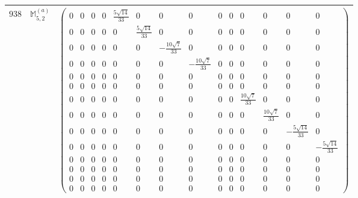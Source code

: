 \documentclass[fleqn,8pt,landscape]{jsarticle}
\begin{document}
\begin{center}
\begin{longtable}{ccc}
$ 938 $ & $ \mathbb{M}_{5,2}^{(a)} $ & $ \begin{pmatrix} 0 & 0 & 0 & 0 & \frac{5 \sqrt{14}}{33} & 0 & 0 & 0 & 0 & 0 & 0 & 0 & 0 & 0 \\ 0 & 0 & 0 & 0 & 0 & \frac{5 \sqrt{14}}{33} & 0 & 0 & 0 & 0 & 0 & 0 & 0 & 0 \\ 0 & 0 & 0 & 0 & 0 & 0 & - \frac{10 \sqrt{7}}{33} & 0 & 0 & 0 & 0 & 0 & 0 & 0 \\ 0 & 0 & 0 & 0 & 0 & 0 & 0 & - \frac{10 \sqrt{7}}{33} & 0 & 0 & 0 & 0 & 0 & 0 \\ 0 & 0 & 0 & 0 & 0 & 0 & 0 & 0 & 0 & 0 & 0 & 0 & 0 & 0 \\ 0 & 0 & 0 & 0 & 0 & 0 & 0 & 0 & 0 & 0 & 0 & 0 & 0 & 0 \\ 0 & 0 & 0 & 0 & 0 & 0 & 0 & 0 & 0 & 0 & \frac{10 \sqrt{7}}{33} & 0 & 0 & 0 \\ 0 & 0 & 0 & 0 & 0 & 0 & 0 & 0 & 0 & 0 & 0 & \frac{10 \sqrt{7}}{33} & 0 & 0 \\ 0 & 0 & 0 & 0 & 0 & 0 & 0 & 0 & 0 & 0 & 0 & 0 & - \frac{5 \sqrt{14}}{33} & 0 \\ 0 & 0 & 0 & 0 & 0 & 0 & 0 & 0 & 0 & 0 & 0 & 0 & 0 & - \frac{5 \sqrt{14}}{33} \\ 0 & 0 & 0 & 0 & 0 & 0 & 0 & 0 & 0 & 0 & 0 & 0 & 0 & 0 \\ 0 & 0 & 0 & 0 & 0 & 0 & 0 & 0 & 0 & 0 & 0 & 0 & 0 & 0 \\ 0 & 0 & 0 & 0 & 0 & 0 & 0 & 0 & 0 & 0 & 0 & 0 & 0 & 0 \\ 0 & 0 & 0 & 0 & 0 & 0 & 0 & 0 & 0 & 0 & 0 & 0 & 0 & 0 \end{pmatrix} $ \\ \hline

\end{longtable}
\end{center}
\end{document}
